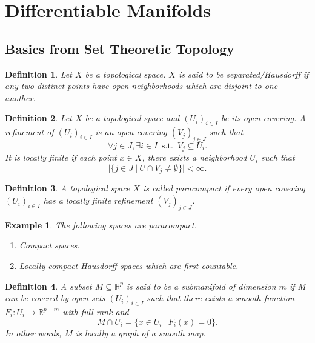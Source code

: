 \documentclass[8pt]{article}
\newtheorem{definition}{Definition}[section]
\newtheorem{example}{Example}[section]
\DeclareMathOperator{\straw}{s.t.}
\newcommand{\R}[0]{\mathbb{R}}
\newcommand{\st}[0]{\:\straw\:}
\begin{document}
\section{Differentiable Manifolds}
\subsection{Basics from Set Theoretic Topology}
\begin{definition}
Let $X$ be a topological space. $X$ is said to be separated/Hausdorff if any two distinct points have open neighborhoods which are disjoint to one another. 
\end{definition}

\begin{definition}
Let $X$ be a topological space and $(U_i)_{i\in I}$ be its open covering. A refinement of $(U_i)_{i\in I}$ is an open covering $(V_j)_{j\in J}$ such that 
\begin{equation*}
\forall j\in J,\exists i\in I\st V_j\subseteq U_i.
\end{equation*}
It is locally finite if each point $x\in X$, there exists a neighborhood $U_i$ such that 
\begin{equation*}
\vert\{ j\in J\:|\: U\cap V_j\not=\emptyset\}\vert <\infty.
\end{equation*} 
\end{definition}

\begin{definition}
A topological space $X$ is called paracompact if every open covering $(U_i)_{i\in I}$ has a locally finite refinement $(V_j)_{j\in J}$. 
\end{definition}

\begin{example}The following spaces are paracompact.
\begin{enumerate}[1).]
\item Compact spaces.
\item Locally compact Hausdorff spaces which are first countable.
\end{enumerate}
\end{example}

\begin{definition}
A subset $M\subseteq\R^p$ is said to be a submanifold of dimension $m$ if $M$ can be covered by open sets $(U_i)_{i\in I}$ such that there exists a smooth function $F_i:U_i\to\R^{p-m}$ with full rank and 
\begin{equation*}
M\cap U_i=\{x\in U_i\:|\: F_i(x)=0\}.
\end{equation*}
In other words, $M$ is locally a graph of a smooth map.
\end{definition}
\end{document}
